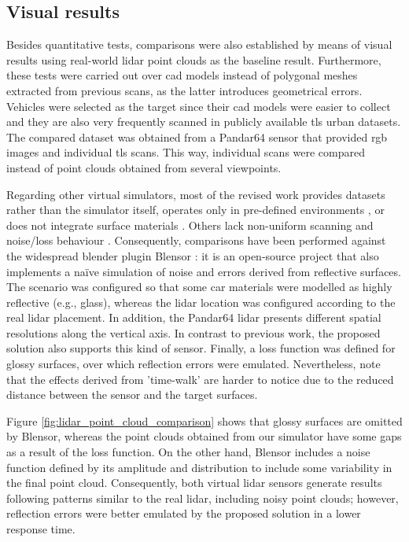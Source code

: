 \subsection{Visual results}

Besides quantitative tests, comparisons were also established by means of visual results using real-world \acrshort{lidar} point clouds as the baseline result. Furthermore, these tests were carried out over \acrshort{cad} models instead of polygonal meshes extracted from previous scans, as the latter introduces geometrical errors. Vehicles were selected as the target since their \acrshort{cad} models were easier to collect and they are also very frequently scanned in publicly available \acrshort{tls} urban datasets. The compared dataset was obtained from a Pandar64 sensor \cite{hesai_pandaset_2021} that provided \acrshort{rgb} images and individual \acrshort{tls} scans. This way, individual scans were compared instead of point clouds obtained from several viewpoints. 

Regarding other virtual simulators, most of the revised work provides datasets rather than the simulator itself, operates only in pre-defined environments \cite{lg_electronics_rd_lab_lgsvl_2021}, or does not integrate surface materials \cite{yue_lidar_2018, xiao_synlidar_2021, manivasagam_lidarsim_2020, fang_augmented_2020, su_simulation_2019}. Others lack non-uniform scanning \cite{dosovitskiy_carla_2017} and noise/loss behaviour \cite{shah_airsim_2017}. Consequently, comparisons have been performed against the widespread blender plugin Blensor \cite{gschwandtner_blensor_2011}: it is an open-source project that also implements a naïve simulation of noise and errors derived from reflective surfaces. The scenario was configured so that some car materials were modelled as highly reflective (e.g., glass), whereas the \acrshort{lidar} location was configured according to the real \acrshort{lidar} placement. In addition, the Pandar64 \acrshort{lidar} presents different spatial resolutions along the vertical axis. In contrast to previous work, the proposed solution also supports this kind of sensor. Finally, a loss function was defined for glossy surfaces, over which reflection errors were emulated. Nevertheless, note that the effects derived from 'time-walk' are harder to notice due to the reduced distance between the sensor and the target surfaces. 

Figure \ref{fig:lidar_point_cloud_comparison} shows that glossy surfaces are omitted by Blensor, whereas the point clouds obtained from our simulator have some gaps as a result of the loss function. On the other hand, Blensor includes a noise function defined by its amplitude and distribution to include some variability in the final point cloud. Consequently, both virtual \acrshort{lidar} sensors generate results following patterns similar to the real \acrshort{lidar}, including noisy point clouds; however, reflection errors were better emulated by the proposed solution in a lower response time.


